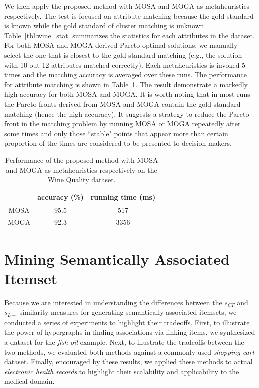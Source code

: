 We then apply the proposed method with MOSA and MOGA as metaheuristics respectively. The test is focused on attribute matching because the gold standard is known while the gold standard of cluster matching is unknown. Table~\ref{tbl:wine_stat} summarizes the statistics for each attributes in the dataset. For both MOSA and MOGA derived Pareto optimal solutions, we manually select the one that is closest to the gold-standard matching (e.g., the solution with 10 out 12 attributes matched correctly). Each metaheuristics is invoked 5 times and the matching accuracy is averaged over these runs. The performance for attribute matching is shown in Table~\ref{tbl:wine_res}. The result demonstrate a markedly high accuracy for both MOSA and MOGA. It is worth noting that in most runs the Pareto fronts derived from MOSA and MOGA contain the gold standard matching (hence the high accuracy). It suggests a strategy to reduce the Pareto front in the matching problem by running MOSA or MOGA repeatedly after some times and only those ``stable" points that appear more than certain proportion of the times are considered to be presented to decision makers.

\begin{table}[tbh]
\begin{center}
\begin{tabular}{c || c | c}
\hline
& accuracy (\%)	&	running time (ms)	\\
\hline
\hline
MOSA	&	95.5	&	517	\\
\hline
MOGA	&	92.3	&	3356\\
\hline
\end{tabular}
\end{center}
\caption{\label{tbl:wine_res} Performance of the proposed method with MOSA and MOGA as metaheuristics respectively on the Wine Quality dataset.}
\end{table}


\section{Mining Semantically Associated Itemset}
\label{experiment}
Because we are interested in understanding the differences between the $s_{CT}$ and $s_{L+}$ similarity measures for generating semantically associated itemsets, we conducted a series of experiments to highlight their tradeoffs.  First, to illustrate the power of hypergraphs in finding associations via linking items, we synthesized a dataset for the \emph{fish oil} example.  Next, to illustrate the tradeoffs between the two methods, we evaluated both methods against a commonly used \emph{shopping cart} dataset.  Finally, encouraged by these results, we applied these methods to actual \emph{electronic health records} to highlight their scalability and applicability to the medical domain.

